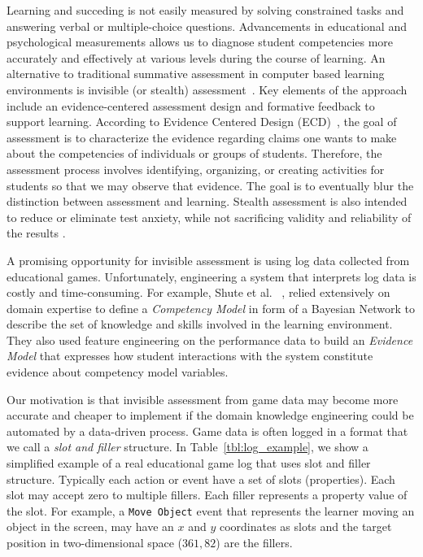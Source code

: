 \documentclass{sigchi}
\begin{document}
Learning and succeding is not easily measured by solving constrained tasks and answering verbal or multiple-choice questions.
Advancements in educational and psychological measurements allows us to diagnose student competencies more accurately and effectively at various levels during the course of learning.
An alternative to traditional summative assessment in computer based learning environments is invisible (or stealth) assessment~\cite{shute2013stealth}.
Key elements of the approach include an evidence-centered assessment design and formative feedback to support learning.
According to Evidence Centered Design (ECD)~\cite{mislevy2012design}, the goal of assessment is to characterize the evidence regarding claims one wants to make about the competencies of individuals or groups of students.
Therefore, the assessment process involves identifying, organizing, or creating activities for students so that we may observe that evidence.
The goal is to eventually blur the distinction between assessment and learning.
Stealth assessment is also intended to reduce or eliminate test anxiety, while not sacrificing validity and reliability of the results \cite{shute2008you}.

A promising opportunity for invisible assessment is using log data collected from educational games.
Unfortunately, engineering a system that interprets log data is costly and time-consuming.
For example, Shute et al. ~\cite{shute2013stealth, shute2009melding}, relied extensively on domain expertise to define a \textit{Competency Model} in form of a Bayesian Network to describe the set of knowledge and skills involved in the learning environment.
They also used feature engineering on the performance data to build an \textit{Evidence Model} that expresses how student interactions with the system constitute evidence about competency model variables.

Our motivation is that invisible assessment from game data may become more accurate and cheaper to implement if the domain knowledge engineering could be automated by a data-driven process.
Game data is often logged  in a format that we call a \textit{slot and filler} structure.
In Table~\ref{tbl:log_example}, we show a simplified example of a real educational game log that uses slot and filler structure.
Typically each action or event have a set of slots (properties).
Each slot may accept zero to multiple fillers. 
Each filler represents a property value of the slot.
For example, a \texttt{Move Object} event  that represents the learner moving an object in the screen, may have an $x$ and $y$ coordinates as slots and the target position in two-dimensional space ($361, 82$) are the fillers.
\end{document}
